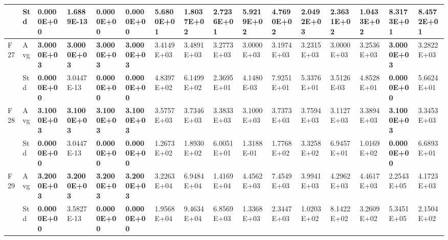 \documentclass{article} %
\begin{document}
\begin{tabular}{|p{0.3in}|p{0.3in}|p{0.3in}|p{0.3in}|p{0.3in}|p{0.3in}|p{0.3in}|p{0.3in}|p{0.3in}|p{0.3in}|p{0.3in}|p{0.3in}|p{0.3in}|p{0.3in}|p{0.3in}|p{0.5in}|}
 & Std & \textbf{0.0000E+00} & 1.6889E-13 & \textbf{0.0000E+00} & \textbf{0.0000E+00} & 5.6800E+01 & 1.8037E+02 & 2.7236E+01 & 5.9219E+02 & 4.7690E+02 & 2.0492E+03 & 2.3631E+02 & 1.0433E+02 & 8.3173E+01 & 8.4572E+01 \\ \hline 
F27 & Avg & \textbf{3.0000E+03} & \textbf{3.0000E+03} & \textbf{3.0000E+03} & \textbf{3.0000E+03} & 3.4149E+03 & 3.4891E+03 & 3.2773E+03 & 3.0000E+03 & 3.1974E+03 & 3.2315E+03 & 3.0000E+03 & 3.2536E+03 & \textbf{3.0000E+03} & 3.2822E+03 \\ \hline 
 & Std & \textbf{0.0000E+00} & 3.0447E-13 & \textbf{0.0000E+00} & \textbf{0.0000E+00} & 4.8397E+02 & 6.1499E+02 & 2.3695E+01 & 4.1480E-03 & 7.9251E+01 & 5.3376E+01 & 3.5126E-03 & 4.8528E+01 & \textbf{0.0000E+00} & 5.6624E+01 \\ \hline 
F28 & Avg & \textbf{3.1000E+03} & \textbf{3.1000E+03} & \textbf{3.1000E+03} & \textbf{3.1000E+03} & 3.5757E+03 & 3.7346E+03 & 3.3833E+03 & 3.1000E+03 & 3.7373E+03 & 3.7594E+03 & 3.1127E+03 & 3.3894E+03 & \textbf{3.1000E+03} & 3.3453E+03 \\ \hline 
 & Std & \textbf{0.0000E+00} & 3.0447E-13 & \textbf{0.0000E+00} & \textbf{0.0000E+00} & 1.2673E+02 & 1.8930E+02 & 6.0051E+01 & 1.3188E-01 & 1.7768E+02 & 3.3258E+02 & 6.9457E+01 & 1.0169E+02 & \textbf{0.0000E+00} & 6.6893E+01 \\ \hline 
F29 & Avg & \textbf{3.2000E+03} & \textbf{3.2000E+03} & \textbf{3.2000E+03} & \textbf{3.2000E+03} & 3.2263E+04 & 6.9484E+04 & 1.4169E+04 & 4.4562E+03 & 7.4549E+03 & 3.9941E+03 & 4.2962E+03 & 4.4617E+03 & 2.2543E+05 & 4.1723E+03 \\ \hline 
 & Std & \textbf{0.0000E+00} & 3.5827E-13 & \textbf{0.0000E+00} & \textbf{0.0000E+00} & 1.9568E+04 & 9.4634E+04 & 6.8569E+03 & 1.3368E+03 & 2.3447E+03 & 1.0203E+02 & 8.1422E+02 & 3.2609E+02 & 5.3451E+05 & 2.1504E+02 \\ \hline 
\end{tabular}
\end{document}
